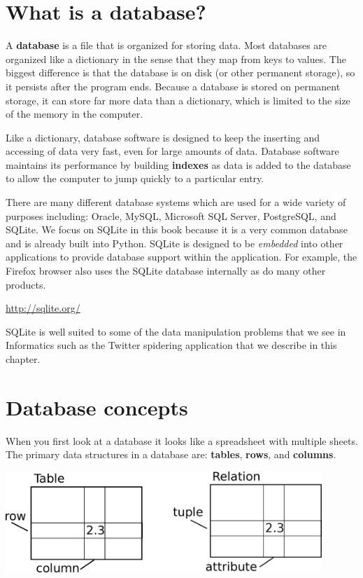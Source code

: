 \documentclass[11pt]{book}
\begin{document}
\section{What is a database?}

A {\bf database} is a file that is organized for storing data.
Most databases are organized like a dictionary in the sense
that they map from keys to values.  The biggest difference
is that the database is on disk (or other permanent storage),
so it persists after the program ends.  Because a database is
stored on permanent storage, it can store far more data than
a dictionary, which is limited to the size of the memory 
in the computer.

Like a dictionary, database software is designed to keep 
the inserting and accessing of data very fast, even for large
amounts of data.   Database software maintains its performance by 
building {\bf indexes} as data is added to the database
to allow the computer to jump quickly to a particular
entry.

There are many different database systems which are used for a wide
variety of purposes including: Oracle, MySQL, Microsoft SQL Server, 
PostgreSQL, and SQLite.  We focus on SQLite in this book because
it is a very common database and is already built into Python.  
SQLite is designed to be \emph{embedded} into other applications
to provide database support within the application.  For example,
the Firefox browser also uses the SQLite database internally as do 
many other products.

\url{http://sqlite.org/}

SQLite is well suited to some of the data manipulation problems that we 
see in Informatics such as the Twitter spidering application that we 
describe in this chapter.

\section{Database concepts}

When you first look at a database it looks like a 
spreadsheet with multiple sheets.   The primary data structures 
in a database are:
{\bf tables}, {\bf rows}, and {\bf columns}.  

\beforefig
\centerline{\includegraphics[height=1.50in]{figs2/relational.eps}}
\afterfig
\end{document}
